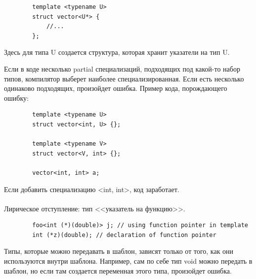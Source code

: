 \documentclass[12pt, a4paper]{article}
\begin{document}
	\begin{verbatim}
		template <typename U>
		struct vector<U*> {
			//...
		};
	\end{verbatim}
	Здесь для типа U создается структура, которая хранит указатели на тип U.\\
	\par Если в коде несколько partial специализаций, подходящих под какой-то набор типов, компилятор выберет наиболее специализированная. Если есть несколько одинаково подходящих, произойдет ошибка. Пример кода, порождающего ошибку:
	\begin{verbatim}
		template <typename U>
		struct vector<int, U> {};
		
		template <typename V>
		struct vector<V, int> {};
		
		vector<int, int> a;
	\end{verbatim}
	Если добавить специализацию <int, int>, код заработает.\\\\
	Лирическое отступление: тип <<указатель на функцию>>.
	\begin{verbatim}
		foo<int (*)(double)> j; // using function pointer in template
		int (*z)(double); // declaration of function pointer
	\end{verbatim}
	\par Типы, которые можно передавать в шаблон, зависят только от того, как они используются внутри шаблона. Например, сам по себе тип void можно передать в шаблон, но если там создается переменная этого типа, произойдет ошибка.
\end{document}
